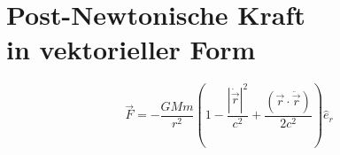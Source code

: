 \section{Post-Newtonische Kraft\\in vektorieller Form}
\[
\vec{F} = -\frac{GMm}{r^2}\left(1 - \frac{|\dot{\vec{r}}|^2}{c^2} + \frac{(\vec{r} \cdot \ddot{\vec{r}})}{2c^2}\right)\hat{e}_r
\]